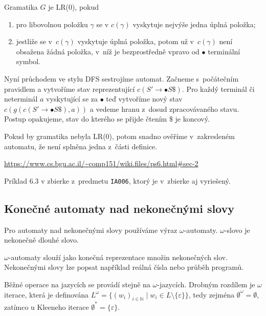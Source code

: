 \begin{definition}
    Gramatika $G$ je LR(0), pokud
    \begin{enumerate}
        \item pro libovolnou položku $\gamma$ se v $c(\gamma)$ vyskytuje
            nejvýše jedna úplná položka;
        \item jestliže se v~$c(\gamma)$ vyskytuje úplná položka, potom
            už v~$c(\gamma)$ není obsažena žádná položka, v~níž
            je bezprostředně vpravo od $\bullet$ terminální symbol.
    \end{enumerate}
\end{definition}

Nyní průchodem ve stylu DFS sestrojíme automat. Začneme s~počátečním
pravidlem a vytvoříme stav reprezentující $c(S' \to \bullet S\$)$.
Pro každý terminál či neterminál $a$ vyskytující se
za $\bullet$ teď vytvoříme nový stav $c(g(c(S' \to \bullet S\$), a))$
a vedeme hranu z~dosud zpracovávaného stavu.
Postup opakujeme, stav do kterého se přijde čtením $\$$ je koncový.

Pokud by gramatika nebyla LR(0), potom snadno ověříme v~zakresleném
automatu, že není splněna jedna z~části definice.

\begin{example}
    \href{https://www.cs.bgu.ac.il/~comp151/wiki.files/ps6.html\#sec-2}
{https://www.cs.bgu.ac.il/{\textasciitilde}comp151/wiki.files/ps6.html\#sec-2}
\end{example}

\begin{example}
	Príklad 6.3 v zbierke z~predmetu \verb|IA006|, ktorý je v~zbierke aj vyriešený.
\end{example}

\subsection{Konečné automaty nad nekonečnými slovy}


Pro automaty nad nekonečnými slovy používáme výraz $\omega$-automaty.
$\omega$-slovo je nekonečně dlouhé slovo.

$\omega$-automaty slouží jako konečná reprezentace množin nekonečných
slov. Nekonečnými slovy lze popsat například reálná čísla nebo průběh
programů.

Běžné operace na jazycích se provádí stejně na $\omega$-jazycích.
Drobným rozdílem je $\omega$ iterace, která je definována
$L^\omega = \{ (w_i)_{i \in \mathbb{N}} \mid w_i \in L \setminus \{ \varepsilon \} \}$,
tedy zejména
$\emptyset^\omega = \emptyset$, zatímco u Kleeneho iterace
$\emptyset^* = \{ \varepsilon \}$.

